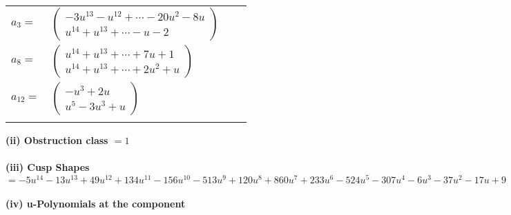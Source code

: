 \documentclass[1p]{elsarticle_modified}
\theoremstyle{definition}
\begin{document}
\begin{tabular}{m{7pt} m{180pt} m{7pt} m{180pt} }
\flushright $a_{3}=$&$\begin{pmatrix}-3 u^{13}- u^{12}+\cdots-20 u^2-8 u\\u^{14}+u^{13}+\cdots- u-2\end{pmatrix}$ \\
\flushright $a_{8}=$&$\begin{pmatrix}u^{14}+u^{13}+\cdots+7 u+1\\u^{14}+u^{13}+\cdots+2 u^2+u\end{pmatrix}$ \\
\flushright $a_{12}=$&$\begin{pmatrix}- u^3+2 u\\u^5-3 u^3+u\end{pmatrix}$\\&\end{tabular}
\flushleft \textbf{(ii) Obstruction class $= 1$}\\~\\
\flushleft \textbf{(iii) Cusp Shapes $= -5 u^{14}-13 u^{13}+49 u^{12}+134 u^{11}-156 u^{10}-513 u^9+120 u^8+860 u^7+233 u^6-524 u^5-307 u^4-6 u^3-37 u^2-17 u+9$}\\~\\
\newpage\renewcommand{\arraystretch}{1}
\flushleft \textbf{(iv) u-Polynomials at the component}\newline \\
\end{document}
